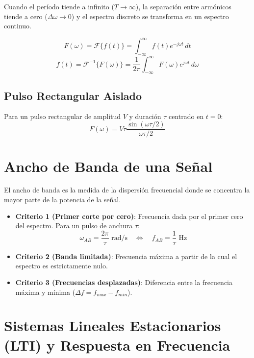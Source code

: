 Cuando el período tiende a infinito ($T \to \infty$), la separación entre armónicos tiende a cero ($\Delta\omega \to 0$) y el espectro discreto se transforma en un espectro continuo.

\begin{equation}
    F(\omega) = \mathcal{F}\{f(t)\} = \int_{-\infty}^{\infty} f(t) e^{-j\omega t} \, dt
\end{equation}
\begin{equation}
    f(t) = \mathcal{F}^{-1}\{F(\omega)\} = \frac{1}{2\pi} \int_{-\infty}^{\infty} F(\omega) e^{j\omega t} \, d\omega
\end{equation}

\subsection{Pulso Rectangular Aislado}
Para un pulso rectangular de amplitud $V$ y duración $\tau$ centrado en $t=0$:
\begin{equation}
    F(\omega) = V \tau \frac{\sin(\omega \tau / 2)}{\omega \tau / 2}
\end{equation}

\section{Ancho de Banda de una Señal}

El ancho de banda es la medida de la dispersión frecuencial donde se concentra la mayor parte de la potencia de la señal.

\begin{itemize}[leftmargin=*]
    \item \textbf{Criterio 1 (Primer corte por cero)}: Frecuencia dada por el primer cero del espectro. Para un pulso de anchura $\tau$:
    \begin{equation}
        \omega_{AB} = \frac{2\pi}{\tau} \text{ rad/s} \quad \iff \quad f_{AB} = \frac{1}{\tau} \text{ Hz}
    \end{equation}
    \item \textbf{Criterio 2 (Banda limitada)}: Frecuencia máxima a partir de la cual el espectro es estrictamente nulo.
    \item \textbf{Criterio 3 (Frecuencias desplazadas)}: Diferencia entre la frecuencia máxima y mínima ($\Delta f = f_{max} - f_{min}$).
\end{itemize}

\section{Sistemas Lineales Estacionarios (LTI) y Respuesta en Frecuencia}

